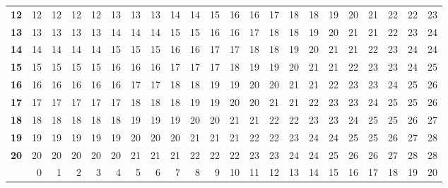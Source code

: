 \documentclass[10pt]{article}
\begin{document}
\begin{table}[ht]
\begin{tabu}{|>{\bfseries}l|rrr|rrr|rrr|rrr|rrr|rrr|rrr|}
    12 & 12 & 12 & 12 & 12 & 13 & 13 & 13 & 14 & 14 & 15 & 16 & 16 & 17 & 18 & 18 & 19 & 20 & 21 & 22 & 22 & 23\\
    13 & 13 & 13 & 13 & 13 & 14 & 14 & 14 & 15 & 15 & 16 & 16 & 17 & 18 & 18 & 19 & 20 & 21 & 21 & 22 & 23 & 24\\
    14 & 14 & 14 & 14 & 14 & 15 & 15 & 15 & 16 & 16 & 17 & 17 & 18 & 18 & 19 & 20 & 21 & 21 & 22 & 23 & 24 & 24\\

    15 & 15 & 15 & 15 & 15 & 16 & 16 & 16 & 17 & 17 & 17 & 18 & 19 & 19 & 20 & 21 & 21 & 22 & 23 & 23 & 24 & 25\\
    16 & 16 & 16 & 16 & 16 & 16 & 17 & 17 & 18 & 18 & 19 & 19 & 20 & 20 & 21 & 21 & 22 & 23 & 23 & 24 & 25 & 26\\
    17 & 17 & 17 & 17 & 17 & 17 & 18 & 18 & 18 & 19 & 19 & 20 & 20 & 21 & 21 & 22 & 23 & 23 & 24 & 25 & 25 & 26\\

    18 & 18 & 18 & 18 & 18 & 18 & 19 & 19 & 19 & 20 & 20 & 21 & 21 & 22 & 22 & 23 & 23 & 24 & 25 & 25 & 26 & 27\\
    19 & 19 & 19 & 19 & 19 & 19 & 20 & 20 & 20 & 21 & 21 & 21 & 22 & 22 & 23 & 24 & 24 & 25 & 25 & 26 & 27 & 28\\
    20 & 20 & 20 & 20 & 20 & 20 & 21 & 21 & 21 & 22 & 22 & 22 & 23 & 23 & 24 & 24 & 25 & 26 & 26 & 27 & 28 & 28\\

    \rowfont{\bfseries}
       & 0  & 1  & 2  & 3  & 4  & 5  &  6 & 7  & 8  & 9  & 10 & 11 & 12 & 13 & 14 & 15 & 16 & 17 & 18 & 19 & 20\\\hline

    \hline
  \end{tabu}
\end{table}
\end{document}
